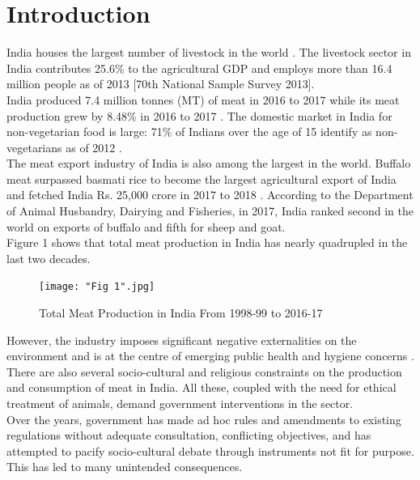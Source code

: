 \documentclass[a4paper, 12pt, twoside]{article}
\begin{document}
\newpage
\section{Introduction}
India houses the largest number of livestock in the world \parencite{sharmanews}. The livestock sector in India contributes 25.6\% to the agricultural GDP and employs more than 16.4 million people as of 2013 [70th National Sample Survey 2013].\\

India produced 7.4 million tonnes (MT) of meat in 2016 to 2017 \parencite{dahreport} while its meat production grew by 8.48\% in 2016 to 2017 \parencite{dah1report}. The domestic market in India for non-vegetarian food is large: 71\% of Indians over the age of 15 identify as non-vegetarians as of 2012 \parencite{mspireport}. \\

The meat export industry of India is also among the largest in the world. Buffalo meat surpassed basmati rice to become the largest agricultural export of India and fetched India Rs. 25,000 crore in 2017 to 2018 \parencite{apedastats}. According to the Department of Animal Husbandry, Dairying and Fisheries, in 2017, India ranked second in the world on exports of buffalo and fifth for sheep and goat.\\ 

Figure 1 shows that total meat production in India has nearly quadrupled in the last two decades.\\

\begin{figure}[H]
\centering
\texttt{[image: "Fig 1".jpg]}
\captionsetup{justification=centering}\caption{Total Meat Production in India From 1998-99 to 2016-17 \parencite{cmiestats}}
\end{figure}

However, the industry imposes significant negative externalities on the environment and is at the centre of emerging public health and hygiene concerns \parencite{praderepaper}. There are also several socio-cultural and religious constraints on the production and consumption of meat in India. All these, coupled with the need for ethical treatment of animals, demand government interventions in the sector. \\

Over the years, government has made ad hoc rules and amendments to existing regulations without adequate consultation, conflicting objectives, and has attempted to pacify socio-cultural debate through instruments not fit for purpose. This has led to many unintended consequences.\\
\end{document}
